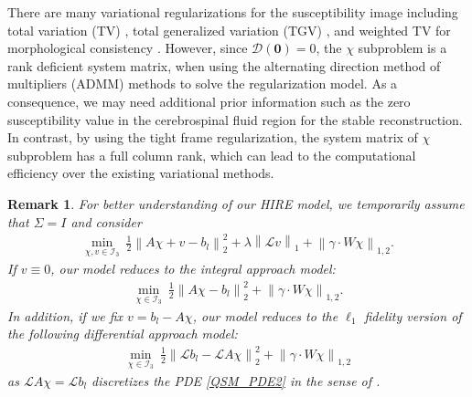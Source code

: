 \documentclass[reqno]{siamonline1116}
\numberwithin{theorem}{section}
\numberwithin{equation}{section}
\newtheorem{remark}[theorem]{Remark}
\def\f{\frac}
\def\mD{{\mathcal D}}
\def\mI{{\mathcal I}}
\def\msL{{\mathscr L}}
\def\0{{\mathbf 0}}
\begin{document}
There are many variational regularizations for the susceptibility image including total variation (TV) \cite{L.I.Rudin1992}, total generalized variation (TGV) \cite{K.Bredies2010,F.Yanez2013}, and weighted TV for morphological consistency \cite{Y.Kee2018}. However, since $\mD(\0)=0$, the $\chi$ subproblem is a rank deficient system matrix, when using the alternating direction method of multipliers (ADMM) methods \cite{J.Eckstein1992} to solve the regularization model. As a consequence, we may need additional prior information such as the zero susceptibility value in the cerebrospinal fluid region \cite{Z.Liu2017} for the stable reconstruction. In contrast, by using the tight frame regularization, the system matrix of $\chi$ subproblem has a full column rank, which can lead to the computational efficiency over the existing variational methods.

\begin{remark}\label{RK231} For better understanding of our HIRE model, we temporarily assume that $\Sigma=I$ and consider
\begin{align*}
\min_{\chi,v\in\mI_3}~\f{1}{2}\left\|A\chi+v-b_l\right\|_2^2+\lambda\left\|\msL v\right\|_1+\left\|\gamma\cdot W\chi\right\|_{1,2}.
\end{align*}
	If $v\equiv0$, our model reduces to the integral approach model:
	\begin{align*}
	\min_{\chi\in\mI_3}~\f{1}{2}\left\|A\chi-b_l\right\|_2^2+\left\|\gamma\cdot W\chi\right\|_{1,2}.
	\end{align*}
	In addition, if we fix $v=b_l-A\chi$, our model reduces to the $\ell_1$ fidelity version of the following differential approach model:
	\begin{align*}
	\min_{\chi\in\mI_3}~\f{1}{2}\left\|\msL b_l-\msL A\chi\right\|_2^2+\left\|\gamma\cdot W\chi\right\|_{1,2}
	\end{align*}
	as $\msL A\chi=\msL b_l$ discretizes the PDE \cref{QSM_PDE2} in the sense of \cite[Proposition A.1.]{J.K.Choi2014}.	
\end{remark}

\end{document}
